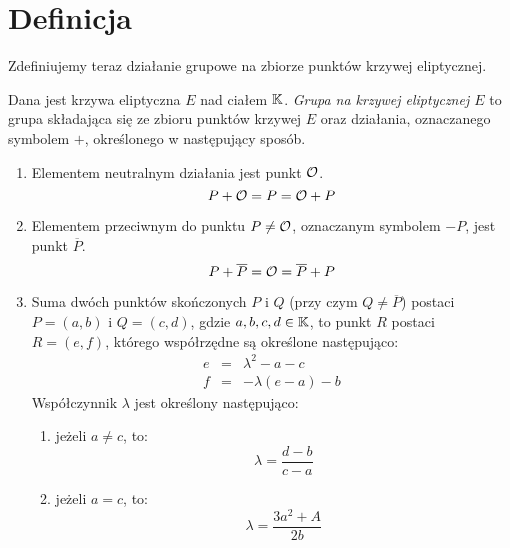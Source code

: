 \section{Definicja}

\noindent
Zdefiniujemy teraz działanie grupowe na zbiorze punktów krzywej eliptycznej.

\begin{definition}\label{ec_groupop_def}
Dana jest krzywa eliptyczna $E$ nad ciałem $\mathbb{K}$.
\emph{Grupa na krzywej eliptycznej $E$}
to grupa składająca się
ze zbioru punktów krzywej $E$
oraz działania, oznaczanego symbolem $+$,
określonego w następujący sposób.
\begin{enumerate}
\item\label{ec_groupop_neutral}
Elementem neutralnym działania jest punkt $\mathcal{O}$.
\begin{equation}
P + \mathcal{O} = P = \mathcal{O} + P
\end{equation}
\item\label{ec_groupop_inverse}
Elementem przeciwnym do punktu $P \neq \mathcal{O}$,
oznaczanym symbolem $-P$,
jest punkt $\overline{P}$.
\begin{equation}
P + \overline{P} = \mathcal{O} = \overline{P} + P
\end{equation}
\item\label{ec_groupop_add_generic}
Suma dwóch punktów skończonych $P$ i $Q$
(przy czym $Q \neq \overline{P}$)
postaci $P = (a, b)$ i $Q = (c, d)$,
gdzie $a, b, c, d \in \mathbb{K}$,
to punkt $R$ postaci $R = (e, f)$,
którego współrzędne są określone następująco:
\begin{eqnarray}
\label{ec_groupop_add_generic_eqn_x}
e & = & \lambda^2 - a - c \\
\label{ec_groupop_add_generic_eqn_y}
f & = & -\lambda(e - a) - b
\end{eqnarray}
Współczynnik $\lambda$ jest określony następująco:
\begin{enumerate}
\item\label{ec_groupop_add_generic_chord}
jeżeli $a \neq c$, to:
\begin{equation}\label{ec_groupop_add_generic_lambda_chord_eqn}
\lambda = \frac{d-b}{c-a}
\end{equation}
\item\label{ec_groupop_add_generic_tangent}
jeżeli $a = c$, to:
\begin{equation}\label{ec_groupop_add_generic_lambda_tangent_eqn}
\lambda = \frac{3a^2+A}{2b}
\end{equation}
\end{enumerate}
\end{enumerate}
\end{definition}

